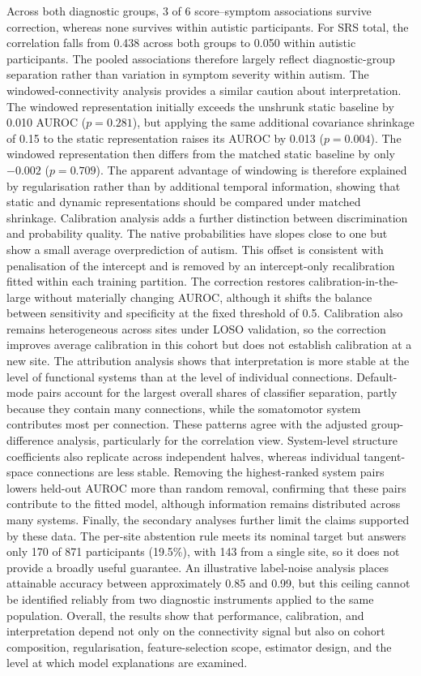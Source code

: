 Across both diagnostic groups, 3 of 6 score--symptom associations survive correction, whereas none survives within autistic participants. For SRS total, the correlation falls from 0.438 across both groups to 0.050 within autistic participants. The pooled associations therefore largely reflect diagnostic-group separation rather than variation in symptom severity within autism. The windowed-connectivity analysis provides a similar caution about interpretation. The windowed representation initially exceeds the unshrunk static baseline by 0.010 AUROC ($p=0.281$), but applying the same additional covariance shrinkage of 0.15 to the static representation raises its AUROC by 0.013 ($p=0.004$). The windowed representation then differs from the matched static baseline by only $-0.002$ ($p=0.709$). The apparent advantage of windowing is therefore explained by regularisation rather than by additional temporal information, showing that static and dynamic representations should be compared under matched shrinkage. Calibration analysis adds a further distinction between discrimination and probability quality. The native probabilities have slopes close to one but show a small average overprediction of autism. This offset is consistent with penalisation of the intercept and is removed by an intercept-only recalibration fitted within each training partition. The correction restores calibration-in-the-large without materially changing AUROC, although it shifts the balance between sensitivity and specificity at the fixed threshold of 0.5. Calibration also remains heterogeneous across sites under LOSO validation, so the correction improves average calibration in this cohort but does not establish calibration at a new site. The attribution analysis shows that interpretation is more stable at the level of functional systems than at the level of individual connections. Default-mode pairs account for the largest overall shares of classifier separation, partly because they contain many connections, while the somatomotor system contributes most per connection. These patterns agree with the adjusted group-difference analysis, particularly for the correlation view. System-level structure coefficients also replicate across independent halves, whereas individual tangent-space connections are less stable. Removing the highest-ranked system pairs lowers held-out AUROC more than random removal, confirming that these pairs contribute to the fitted model, although information remains distributed across many systems. Finally, the secondary analyses further limit the claims supported by these data. The per-site abstention rule meets its nominal target but answers only 170 of 871 participants (19.5\%), with 143 from a single site, so it does not provide a broadly useful guarantee. An illustrative label-noise analysis places attainable accuracy between approximately 0.85 and 0.99, but this ceiling cannot be identified reliably from two diagnostic instruments applied to the same population. Overall, the results show that performance, calibration, and interpretation depend not only on the connectivity signal but also on cohort composition, regularisation, feature-selection scope, estimator design, and the level at which model explanations are examined.

